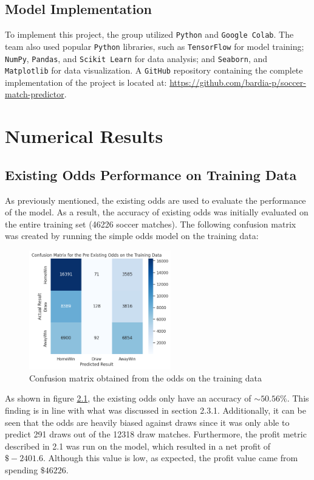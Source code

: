 \documentclass[rgb,listoffigures,listoftables,final]{cam-thesis}
\begin{document}
    \section{Model Implementation}
    To implement this project, the group utilized \texttt{Python} and \texttt{Google Colab}. The team also used popular \texttt{Python} libraries, such as \texttt{TensorFlow} for model training; \texttt{NumPy}, \texttt{Pandas}, and \texttt{Scikit Learn} for data analysis; and \texttt{Seaborn}, and \texttt{Matplotlib} for data visualization. A \texttt{GitHub} repository containing the complete implementation of the project is located at: \url{https://github.com/bardia-p/soccer-match-predictor}.
    
    
\chapter{Numerical Results}
    \section{Existing Odds Performance on Training Data}
    As previously mentioned, the existing odds are used to evaluate the performance of the model. As a result, the accuracy of existing odds was initially evaluated on the entire training set (46226 soccer matches). The following confusion matrix was created by running the simple odds model on the training data:
    \begin{figure}[H]
        \centering
        \includegraphics[width=0.55\textwidth]{figures/cm_existing_odds_training.png}
        \caption{Confusion matrix obtained from the odds on the training data}
        \label{fig:cm-odds-training}
    \end{figure}

    As shown in figure \ref{fig:cm-odds-training}, the existing odds only have an accuracy of $\sim 50.56\%$. This finding is in line with what was discussed in section 2.3.1. Additionally, it can be seen that the odds are heavily biased against draws since it was only able to predict 291 draws out of the 12318 draw matches. Furthermore, the profit metric described in 2.1 was run on the model, which resulted in a net profit of $\$-2401.6$. Although this value is low, as expected, the profit value came from spending $\$46226$.
    
\end{document}
